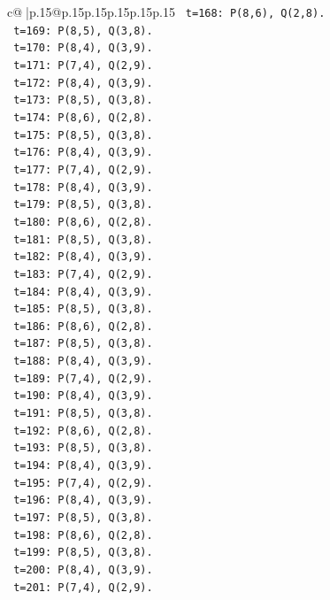 \documentclass{article}
\begin{document}
{\begin{supertabular}{c@{$\;$}|p{.15\linewidth}@{}p{.15\linewidth}p{.15\linewidth}p{.15\linewidth}p{.15\linewidth}p{.15\linewidth}}
{{{\texttt{   t=168: P(8,6), Q(2,8).} \\
\texttt{   t=169: P(8,5), Q(3,8).} \\
\texttt{   t=170: P(8,4), Q(3,9).} \\
\texttt{   t=171: P(7,4), Q(2,9).} \\
\texttt{   t=172: P(8,4), Q(3,9).} \\
\texttt{   t=173: P(8,5), Q(3,8).} \\
\texttt{   t=174: P(8,6), Q(2,8).} \\
\texttt{   t=175: P(8,5), Q(3,8).} \\
\texttt{   t=176: P(8,4), Q(3,9).} \\
\texttt{   t=177: P(7,4), Q(2,9).} \\
\texttt{   t=178: P(8,4), Q(3,9).} \\
\texttt{   t=179: P(8,5), Q(3,8).} \\
\texttt{   t=180: P(8,6), Q(2,8).} \\
\texttt{   t=181: P(8,5), Q(3,8).} \\
\texttt{   t=182: P(8,4), Q(3,9).} \\
\texttt{   t=183: P(7,4), Q(2,9).} \\
\texttt{   t=184: P(8,4), Q(3,9).} \\
\texttt{   t=185: P(8,5), Q(3,8).} \\
\texttt{   t=186: P(8,6), Q(2,8).} \\
\texttt{   t=187: P(8,5), Q(3,8).} \\
\texttt{   t=188: P(8,4), Q(3,9).} \\
\texttt{   t=189: P(7,4), Q(2,9).} \\
\texttt{   t=190: P(8,4), Q(3,9).} \\
\texttt{   t=191: P(8,5), Q(3,8).} \\
\texttt{   t=192: P(8,6), Q(2,8).} \\
\texttt{   t=193: P(8,5), Q(3,8).} \\
\texttt{   t=194: P(8,4), Q(3,9).} \\
\texttt{   t=195: P(7,4), Q(2,9).} \\
\texttt{   t=196: P(8,4), Q(3,9).} \\
\texttt{   t=197: P(8,5), Q(3,8).} \\
\texttt{   t=198: P(8,6), Q(2,8).} \\
\texttt{   t=199: P(8,5), Q(3,8).} \\
\texttt{   t=200: P(8,4), Q(3,9).} \\
\texttt{   t=201: P(7,4), Q(2,9).} \\
}}}
\end{supertabular}}
\end{document}
